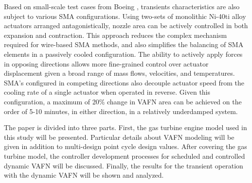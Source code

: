 Based on small-scale test cases from Boeing \cite{Mabe:2008,Mabe:2008:Paris},
transients characteristics are also subject to various SMA configurations.
Using two-sets of monolithic Ni-40ti alloy actuators arranged antagonistically,
nozzle area can be actively controlled in both expansion and contraction. This
approach reduces the complex mechanism required for wire-based SMA methods,
and also simplifies the balancing of SMA elements in a passively cooled
configuration. The ability to actively apply forces in opposing directions
allows more fine-grained control over actuator displacement given a broad range
of mass flows, velocities, and temperatures. SMA's configured in competing
directions also decouple actuator speed from the cooling rate of a single
actuator when operated in reverse. Given this configuration, a maximum of 20\%
change in VAFN area can be achieved on the order of 5-10 minutes, in either
direction, in a relatively underdamped system.

The paper is divided into three parts. First, the gas turbine engine model used in 
this study will be presented. Particular details about VAFN modeling will be given 
in addition to multi-design point cycle design values. After covering the gas 
turbine model, the controller development processes for scheduled and controlled
dynamic VAFN will be discussed. Finally, the results for the transient operation 
with the dynamic VAFN will be shown and analyzed.